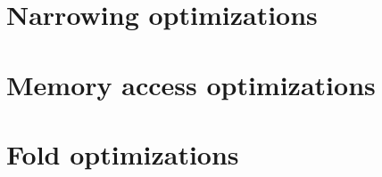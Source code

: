 
\section{Narrowing optimizations}
\label{Sec:narrowing}

\section{Memory access optimizations}
\label{Sec:mao}

\section{Fold optimizations}
\label{Sec:fold}






